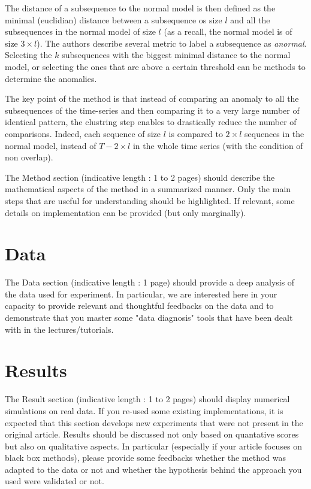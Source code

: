 \documentclass[11pt]{article}
\begin{document}
The distance of a subsequence to the normal model is then defined as the minimal (euclidian) distance between a subsequence os size $l$ and all the subsequences in the normal model of size $l$ (as a recall, the normal model is of size $3 \times l$).
The authors describe several metric to label a subsequence as \textit{anormal}. 
Selecting the $k$ subsequences with the biggest minimal distance to the normal model, or selecting the ones that are above a certain threshold can be methods to determine the anomalies.

The key point of the method is that instead of comparing an anomaly to all the subsequences of the time-series and then comparing it to a very large number of identical pattern, the clustring step enables to drastically reduce the number of comparisons. 
Indeed, each sequence of size $l$ is compared to $2 \times l $ sequences in the normal model, instead of $T - 2 \times l$ in the whole time series (with the condition of non overlap). 




The Method section (indicative length : 1 to 2 pages) should describe the mathematical aspects of the method in a summarized manner. Only the main steps that are useful for understanding should be highlighted. If relevant, some details on implementation can be provided (but only marginally).

\section{Data}
The Data section (indicative length : 1 page) should provide a deep analysis of the data used for experiment. In particular, we are interested here in your capacity to provide relevant and thoughtful feedbacks on the data and to demonstrate that you master some "data diagnosis" tools that have been dealt with in the lectures/tutorials.

\section{Results}
The Result section (indicative length : 1 to 2 pages) should display numerical simulations on real data. If you re-used some existing implementations, it is expected that this section develops new experiments that were not present in the original article. Results should be discussed not only based on quantative scores but also on qualitative aspects. In particular (especially if your article focuses on black box methods), please provide some feedbacks whether the method was adapted to the data or not and whether the hypothesis behind the approach you used were validated or not.
\end{document}

